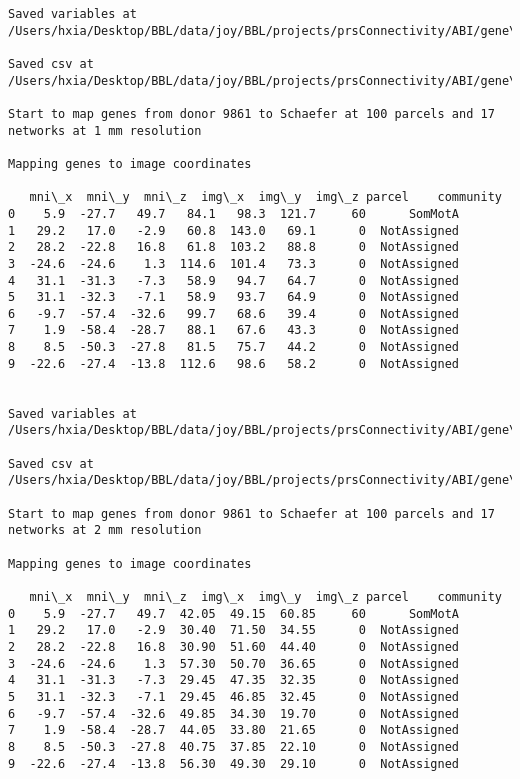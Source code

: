 \documentclass[11pt]{article}
\begin{document}
\begin{Verbatim}[commandchars=\\\{\}]
Saved variables at /Users/hxia/Desktop/BBL/data/joy/BBL/projects/prsConnectivity/ABI/gene\_mapping/9861donor\_100Parcels\_7Network\_2mm.pkl

Saved csv at /Users/hxia/Desktop/BBL/data/joy/BBL/projects/prsConnectivity/ABI/gene\_mapping/9861donor\_100Parcels\_7Network\_2mm.csv

Start to map genes from donor 9861 to Schaefer at 100 parcels and 17 networks at 1 mm resolution

Mapping genes to image coordinates

   mni\_x  mni\_y  mni\_z  img\_x  img\_y  img\_z parcel    community
0    5.9  -27.7   49.7   84.1   98.3  121.7     60      SomMotA
1   29.2   17.0   -2.9   60.8  143.0   69.1      0  NotAssigned
2   28.2  -22.8   16.8   61.8  103.2   88.8      0  NotAssigned
3  -24.6  -24.6    1.3  114.6  101.4   73.3      0  NotAssigned
4   31.1  -31.3   -7.3   58.9   94.7   64.7      0  NotAssigned
5   31.1  -32.3   -7.1   58.9   93.7   64.9      0  NotAssigned
6   -9.7  -57.4  -32.6   99.7   68.6   39.4      0  NotAssigned
7    1.9  -58.4  -28.7   88.1   67.6   43.3      0  NotAssigned
8    8.5  -50.3  -27.8   81.5   75.7   44.2      0  NotAssigned
9  -22.6  -27.4  -13.8  112.6   98.6   58.2      0  NotAssigned


Saved variables at /Users/hxia/Desktop/BBL/data/joy/BBL/projects/prsConnectivity/ABI/gene\_mapping/9861donor\_100Parcels\_17Network\_1mm.pkl

Saved csv at /Users/hxia/Desktop/BBL/data/joy/BBL/projects/prsConnectivity/ABI/gene\_mapping/9861donor\_100Parcels\_17Network\_1mm.csv

Start to map genes from donor 9861 to Schaefer at 100 parcels and 17 networks at 2 mm resolution

Mapping genes to image coordinates

   mni\_x  mni\_y  mni\_z  img\_x  img\_y  img\_z parcel    community
0    5.9  -27.7   49.7  42.05  49.15  60.85     60      SomMotA
1   29.2   17.0   -2.9  30.40  71.50  34.55      0  NotAssigned
2   28.2  -22.8   16.8  30.90  51.60  44.40      0  NotAssigned
3  -24.6  -24.6    1.3  57.30  50.70  36.65      0  NotAssigned
4   31.1  -31.3   -7.3  29.45  47.35  32.35      0  NotAssigned
5   31.1  -32.3   -7.1  29.45  46.85  32.45      0  NotAssigned
6   -9.7  -57.4  -32.6  49.85  34.30  19.70      0  NotAssigned
7    1.9  -58.4  -28.7  44.05  33.80  21.65      0  NotAssigned
8    8.5  -50.3  -27.8  40.75  37.85  22.10      0  NotAssigned
9  -22.6  -27.4  -13.8  56.30  49.30  29.10      0  NotAssigned



\end{Verbatim}
\end{document}
